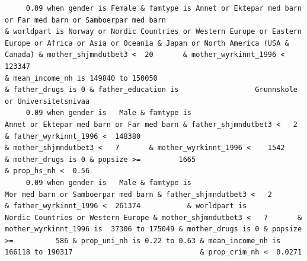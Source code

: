 \documentclass[
  letterpaper,
  DIV=11,
  numbers=noendperiod]{scrreprt}
\begin{document}
\begin{verbatim}
     0.09 when gender is Female & famtype is Annet or Ektepar med barn or Far med barn or Samboerpar med barn                                                                              & worldpart is Norway or Nordic Countries or Western Europe or Eastern Europe or Africa or Asia or Oceania & Japan or North America (USA & Canada) & mother_shjmndutbet3 <  20       & mother_wyrkinnt_1996 <  123347                                                                                       & mean_income_nh is 149840 to 150050                                                                                                                                                                                                                              & father_drugs is 0 & father_education is                  Grunnskole or Universitetsnivaa                    
     0.09 when gender is   Male & famtype is                        Annet or Ektepar med barn or Far med barn & father_shjmndutbet3 <   2       & father_wyrkinnt_1996 <  148380                                                                                                                                                              & mother_shjmndutbet3 <   7       & mother_wyrkinnt_1996 <    1542           & mother_drugs is 0 & popsize >=         1665                                                                    & prop_hs_nh <  0.56                                                                                                                                                                                                                                                                                                                       
     0.09 when gender is   Male & famtype is                              Mor med barn or Samboerpar med barn & father_shjmndutbet3 <   2       & father_wyrkinnt_1996 <  261374           & worldpart is                                                                                                  Nordic Countries or Western Europe & mother_shjmndutbet3 <   7       & mother_wyrkinnt_1996 is  37306 to 175049 & mother_drugs is 0 & popsize >=          586 & prop_uni_nh is 0.22 to 0.63 & mean_income_nh is 166118 to 190317                              & prop_crim_nh <  0.0271                                                                                                                                                                                                                                                                                      

\end{verbatim}
\end{document}
